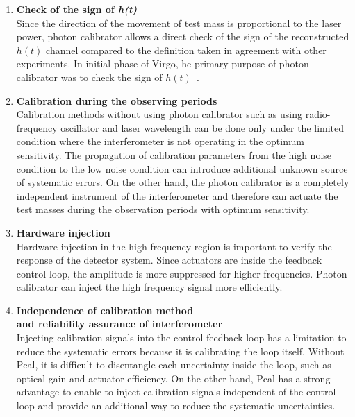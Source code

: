 \begin{enumerate}
\item {\bf Check of the sign of \sl h(t)}\\
Since the direction of the movement of test mass is proportional to the 
laser power, photon calibrator allows a direct check of the sign of the 
reconstructed $h(t)$ channel compared to the definition taken in agreement 
with other experiments. In initial phase of Virgo, he primary purpose of 
photon calibrator was to check the sign of $h(t)$~\cite{VIR-018}.

\item {\bf Calibration during the observing periods}\\
Calibration methods without using photon calibrator such as using 
radio-frequency oscillator and laser wavelength can be done only under the 
limited condition where the interferometer is not operating in the optimum 
sensitivity. The propagation of calibration parameters from the high noise 
condition to the low noise condition can introduce additional unknown source 
of systematic errors. On the other hand, the photon calibrator is a completely 
independent instrument of the interferometer and therefore can actuate 
the test masses during the observation periods with optimum sensitivity. 

\item {\bf Hardware injection}\\
Hardware injection in the high frequency region is important to verify the 
response of the detector system. Since actuators are inside the feedback 
control loop, the amplitude is more suppressed for higher frequencies. 
Photon calibrator can inject the high frequency signal more efficiently. 

\item {\bf Independence of calibration method\\
      and reliability assurance of interferometer}\\
Injecting calibration signals into the control feedback loop has a limitation 
to reduce the systematic errors because it is calibrating the loop itself.
Without Pcal, it is difficult to disentangle each uncertainty inside the loop, 
such as optical gain and actuator efficiency. On the other hand, Pcal has a 
strong advantage to enable to inject calibration signals independent of the 
control loop and provide an additional way to reduce the systematic 
uncertainties.


\end{enumerate}
